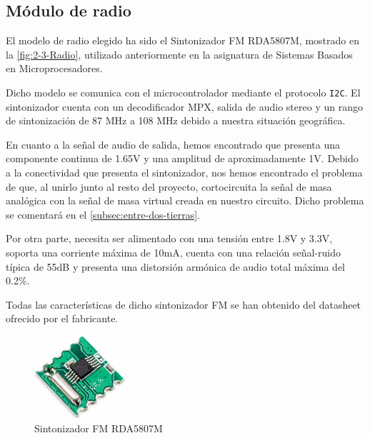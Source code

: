 \subsection{Módulo de radio}
El modelo de radio elegido ha sido el Sintonizador FM RDA5807M, mostrado en la \autoref{fig:2-3-Radio},  utilizado anteriormente en la asignatura de Sistemas Basados en Microprocesadores.

Dicho modelo se comunica con el microcontrolador mediante el protocolo \texttt{I2C}. El sintonizador cuenta con un decodificador MPX, salida de audio stereo y un rango de sintonización de 87 MHz a 108 MHz debido a nuestra situación geográfica.

En cuanto a la señal de audio de salida, hemos encontrado que presenta una componente continua de 1.65V y una amplitud de aproximadamente 1V. Debido a la conectividad que presenta el sintonizador, nos hemos encontrado el problema de que, al unirlo junto al resto del proyecto, cortocircuita la señal de masa analógica con la señal de masa virtual creada en nuestro circuito. Dicho problema se comentará en el \autoref{subsec:entre-dos-tierras}.

Por otra parte, necesita ser alimentado con una tensión entre 1.8V y 3.3V, soporta una corriente máxima de 10mA, cuenta con una relación señal-ruido típica de 55dB y presenta una distorsión armónica de audio total máxima del 0.2\%.

Todas las características de dicho sintonizador FM se han obtenido del datasheet ofrecido por el fabricante.

\begin{figure}[h]
    \centering
    \includegraphics[width=0.3\textwidth]{images/2/2-3/Radio.jpg}
    \caption{Sintonizador FM RDA5807M}
    \label{fig:2-3-Radio}
\end{figure}